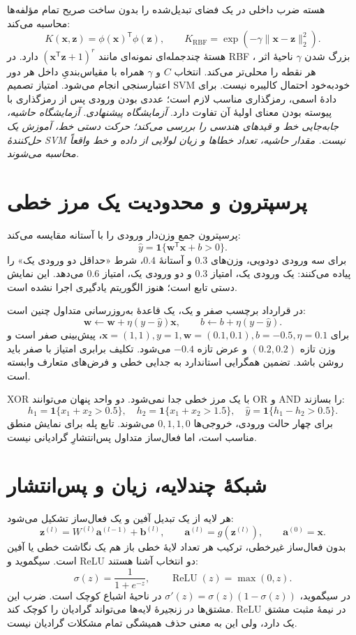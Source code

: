 هسته ضرب داخلی در یک فضای تبدیل‌شده را بدون ساخت صریح تمام مؤلفه‌ها محاسبه می‌کند:
\[K(\mathbf x,\mathbf z)=\phi(\mathbf x)^\mathsf T\phi(\mathbf z),\qquad K_{\mathrm{RBF}}=\exp(-\gamma\|\mathbf x-\mathbf z\|_2^2).\]
هستهٔ چندجمله‌ای نمونه‌ای مانند $(\mathbf x^\mathsf T\mathbf z+1)^r$ دارد. در RBF ، بزرگ شدن $\gamma$ ناحیهٔ اثر هر نقطه را محلی‌تر می‌کند. انتخاب $C$ و $\gamma$ همراه با مقیاس‌بندیِ داخل هر دور اعتبارسنجی انجام می‌شود. امتیاز تصمیم SVM خودبه‌خود احتمال کالیبره نیست. برای دادهٔ اسمی، رمزگذاری مناسب لازم است؛ عددی بودن ورودی پس از رمزگذاری با پیوسته بودن معنای اولیهٔ آن تفاوت دارد.
\textit{آزمایشگاه پیشنهادی. آزمایشگاه حاشیه، جابه‌جایی خط و قیدهای هندسی را بررسی می‌کند؛ حرکت دستی خط، آموزش یک حل‌کنندهٔ SVM نیست. مقدار حاشیه، تعداد خطاها و زیان لولایی از داده و خط واقعاً محاسبه می‌شوند.}\par 

\section{پرسپترون و محدودیت یک مرز خطی}
پرسپترون جمع وزن‌دار ورودی را با آستانه مقایسه می‌کند:
\[\widehat y=\mathbf1\{\mathbf w^\mathsf T\mathbf x+b>0\}.\]
برای سه ورودی دودویی، وزن‌های $0.3$ و آستانهٔ $0.4$، شرط «حداقل دو ورودی یک» را پیاده می‌کنند: یک ورودی یک، امتیاز $0.3$ و دو ورودی یک، امتیاز $0.6$ می‌دهد. این نمایش دستی تابع است؛ هنوز الگوریتم یادگیری اجرا نشده است.

در قرارداد برچسب صفر و یک، یک قاعدهٔ به‌روزرسانی متداول چنین است:
\[\mathbf w\leftarrow\mathbf w+\eta(y-\widehat y)\mathbf x,\qquad b\leftarrow b+\eta(y-\widehat y).\]
برای $\mathbf x=(1,1),y=1,\mathbf w=(0.1,0.1),b=-0.5,\eta=0.1$، پیش‌بینی صفر است و وزن تازه $(0.2,0.2)$ و عرض تازه $-0.4$ می‌شود. تکلیف برابری امتیاز با صفر باید روشن باشد. تضمین همگرایی استاندارد به جدایی خطی و فرض‌های متعارف وابسته است.

XOR با یک مرز خطی جدا نمی‌شود. دو واحد پنهان می‌توانند OR و AND را بسازند:
\[h_1=\mathbf1\{x_1+x_2>0.5\},\quad h_2=\mathbf1\{x_1+x_2>1.5\},\quad \widehat y=\mathbf1\{h_1-h_2>0.5\}.\]
برای چهار حالت ورودی، خروجی‌ها $0,1,1,0$ می‌شوند. تابع پله برای نمایش منطق مناسب است، اما فعال‌ساز متداول پس‌انتشارِ گرادیانی نیست.

\section{شبکهٔ چندلایه، زیان و پس‌انتشار}
هر لایه از یک تبدیل آفین و یک فعال‌ساز تشکیل می‌شود:
\[\mathbf z^{(l)}=W^{(l)}\mathbf a^{(l-1)}+\mathbf b^{(l)},\qquad \mathbf a^{(l)}=g(\mathbf z^{(l)}),\qquad \mathbf a^{(0)}=\mathbf x.\]
بدون فعال‌ساز غیرخطی، ترکیب هر تعداد لایهٔ خطی باز هم یک نگاشت خطی یا آفین است. سیگموید و ReLU دو انتخاب آشنا هستند:
\[\sigma(z)=\frac1{1+e^{-z}},\qquad\operatorname{ReLU}(z)=\max(0,z).\]
در سیگموید، $\sigma'(z)=\sigma(z)(1-\sigma(z))$ در ناحیهٔ اشباع کوچک است. ضرب این مشتق‌ها در زنجیرهٔ لایه‌ها می‌تواند گرادیان را کوچک کند. ReLU در نیمهٔ مثبت مشتق یک دارد، ولی این به معنی حذف همیشگی تمام مشکلات گرادیان نیست.

